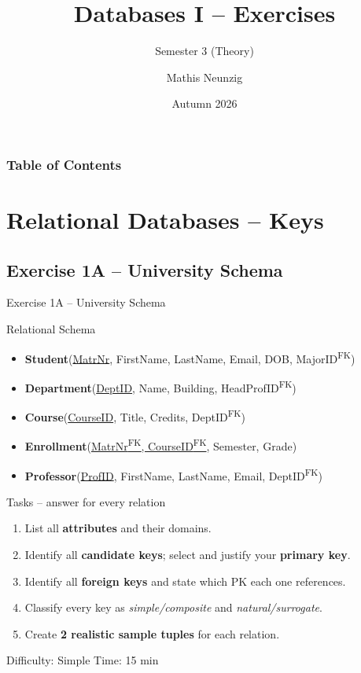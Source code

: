 \documentclass[10pt]{beamer}
\title[Databases I -- Exercises]{Databases I -- Exercises}
\subtitle{Semester 3 (Theory)}
\author[Neunzig, M.]{Mathis Neunzig}
\institute[DHBW Mosbach]{DHBW Mosbach}
\date[Autumn 2026]{Autumn 2026}
\begin{document}
\frame{\titlepage}

\begin{frame}
  \frametitle{Table of Contents}
  \tableofcontents
\end{frame}

\section{Relational Databases -- Keys}

\subsection{Exercise 1A -- University Schema}

\begin{frame}{Exercise 1A -- University Schema}
  \begin{block}{Relational Schema}
    \small
    \begin{itemize}
      \item \textbf{Student}(\underline{MatrNr}, FirstName, LastName, Email, DOB, MajorID\textsuperscript{FK})
      \item \textbf{Department}(\underline{DeptID}, Name, Building, HeadProfID\textsuperscript{FK})
      \item \textbf{Course}(\underline{CourseID}, Title, Credits, DeptID\textsuperscript{FK})
      \item \textbf{Enrollment}(\underline{MatrNr\textsuperscript{FK}, CourseID\textsuperscript{FK}}, Semester, Grade)
      \item \textbf{Professor}(\underline{ProfID}, FirstName, LastName, Email, DeptID\textsuperscript{FK})
    \end{itemize}
  \end{block}

  \begin{block}{Tasks -- answer for every relation}
    \begin{enumerate}
      \item List all \textbf{attributes} and their domains.
      \item Identify all \textbf{candidate keys}; select and justify your \textbf{primary key}.
      \item Identify all \textbf{foreign keys} and state which PK each one references.
      \item Classify every key as \emph{simple/composite} and \emph{natural/surrogate}.
      \item Create \textbf{2 realistic sample tuples} for each relation.
    \end{enumerate}
  \end{block}

  \begin{alertblock}{Difficulty: Simple \quad Time: 15 min}
  \end{alertblock}
\end{frame}
\end{document}
